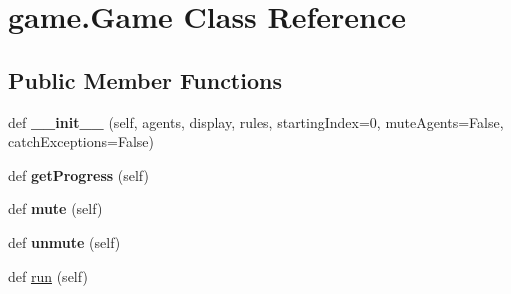 \hypertarget{classgame_1_1_game}{}\section{game.\+Game Class Reference}
\label{classgame_1_1_game}
\subsection*{Public Member Functions}
\begin{DoxyCompactItemize}
\item 
\mbox{\label{classgame_1_1_game_a0252ff2844570b8cdb4d8cc2773e38f3}} 
def {\bfseries \+\_\+\+\_\+init\+\_\+\+\_\+} (self, agents, display, rules, starting\+Index=0, mute\+Agents=False, catch\+Exceptions=False)
\item 
\mbox{\label{classgame_1_1_game_a612b385764b718342a51541d078513bb}} 
def {\bfseries get\+Progress} (self)
\item 
\mbox{\label{classgame_1_1_game_a88817c9dc6f5755f999043cdafddf791}} 
def {\bfseries mute} (self)
\item 
\mbox{\label{classgame_1_1_game_a48c3a76f1dc82f1630ee91021cd0db93}} 
def {\bfseries unmute} (self)
\item 
def \hyperlink{classgame_1_1_game_a5ac60e090ecb22edd8fe33073b45866e}{run} (self)
\end{DoxyCompactItemize}
